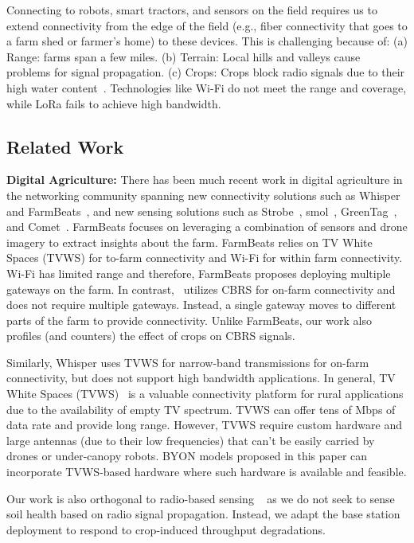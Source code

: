 Connecting to robots, smart tractors, and sensors on the field requires us to extend connectivity from the edge of the field (e.g., fiber connectivity that goes to a farm shed or farmer's home) to these devices. This is challenging because of: (a) Range: farms span a few miles. (b) Terrain: Local hills and valleys cause problems for signal propagation. (c) Crops: Crops block radio signals due to their high water content~\cite{wu2017propagation}. Technologies like Wi-Fi do not meet the range and coverage, while LoRa fails to achieve high bandwidth. 



\subsection{Related Work}
\noindent\textbf{Digital Agriculture: }There has been much recent work in digital agriculture in the networking community spanning new connectivity solutions such as Whisper~\cite{whisper} and FarmBeats~\cite{farmbeats}, and new sensing solutions such as Strobe~\cite{strobe}, smol~\cite{smol}, GreenTag~\cite{greentag}, and Comet~\cite{comet}. FarmBeats focuses on leveraging a combination of sensors and drone imagery to extract insights about the farm. FarmBeats relies on TV White Spaces (TVWS) for to-farm connectivity and Wi-Fi for within farm connectivity. Wi-Fi has limited range and therefore, FarmBeats proposes deploying multiple gateways on the farm. In contrast, \name\ utilizes CBRS for on-farm connectivity and does not require multiple gateways. Instead, a single gateway moves to different parts of the farm to provide connectivity. Unlike FarmBeats, our work also profiles (and counters) the effect of crops on CBRS signals.

Similarly, Whisper uses TVWS for narrow-band transmissions for on-farm connectivity, but does not support high bandwidth applications. In general, TV White Spaces (TVWS)~\cite{whitefi,whisper} is a valuable connectivity platform for rural applications due to the availability of empty TV spectrum. TVWS can offer tens of Mbps of data rate and provide long range. However, TVWS require custom hardware and large antennas (due to their low frequencies) that can't be easily carried by drones or under-canopy robots. BYON models proposed in this paper can incorporate TVWS-based hardware where such hardware is available and feasible. 

Our work is also orthogonal to radio-based sensing ~\cite{strobe,smol,greentag,comet} as we do not seek to sense soil health based on radio signal propagation. Instead, we adapt the base station deployment to respond to crop-induced throughput degradations.

